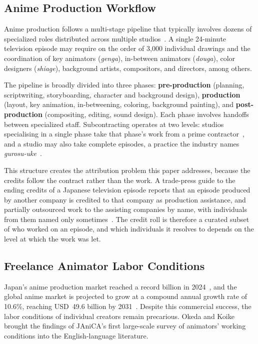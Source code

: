 
\subsection{Anime Production Workflow}
\label{subsec:anime_workflow}

Anime production follows a multi-stage pipeline that typically involves dozens of specialized roles
distributed across multiple studios~\cite{matsunaga2025labor, oki2026survey}.
A single 24-minute television episode may require on the order of 3{,}000 individual drawings
and the coordination of key animators (\textit{genga}), in-between animators (\textit{douga}),
color designers (\textit{shiage}), background artists, compositors, and directors,
among others.

The pipeline is broadly divided into three phases:
\textbf{pre-production} (planning, scriptwriting, storyboarding, character and background design),
\textbf{production} (layout, key animation, in-betweening, coloring, background painting),
and \textbf{post-production} (compositing, editing, sound design).
Each phase involves handoffs between specialized staff. Subcontracting operates at two
levels: studios specialising in a single phase take that phase's work from a prime
contractor~\cite{matsunaga2025labor}, and a studio may also take complete episodes,
a practice the industry names \textit{gurosu-uke}~\cite{oki2026survey}.

This structure creates the attribution problem this paper addresses, because the
credits follow the contract rather than the work. A trade-press guide to the ending
credits of a Japanese television episode reports that an episode produced by another
company is credited to that company as production assistance, and partially outsourced
work to the assisting companies by name, with individuals from them named only
sometimes~\cite{cirugeda2016credits}. The credit roll is therefore a curated subset of
who worked on an episode, and which individuals it resolves to depends on the level at
which the work was let.

\subsection{Freelance Animator Labor Conditions}
\label{subsec:labor}

Japan's anime production market reached a record  billion in 2024~\cite{tdb2025anime},
and the global anime market is projected to grow at a compound annual growth rate of 10.6\%,
reaching USD~49.6 billion by 2031~\cite{mordor2026anime}.
Despite this commercial success, the labor conditions of individual creators remain precarious.
Okeda and Koike~\cite{okeda2011animators} brought the findings of JAniCA's first
large-scale survey of animators' working conditions into the English-language
literature.

